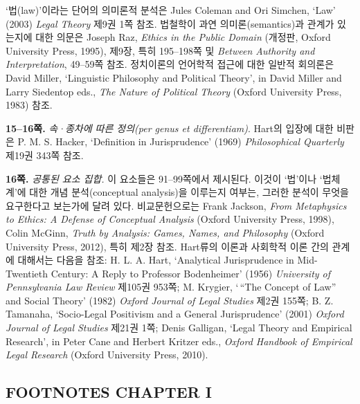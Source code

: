 \documentclass[12pt, oneside]{book}  %
\begin{document}
`법(law)'이라는 단어의 의미론적 분석은 Jules Coleman and Ori Simchen,
`Law' (2003) \emph{Legal Theory} 제9권 1쪽 참조. 법철학이 과연
의미론(semantics)과 관계가 있는지에 대한 의문은 Joseph Raz, \emph{Ethics
in the Public Domain} (개정판, Oxford University Press, 1995), 제9장,
특히 195--198쪽 및 \emph{Between Authority and Interpretation}, 49--59쪽
참조. 정치이론의 언어학적 접근에 대한 일반적 회의론은 David Miller,
`Linguistic Philosophy and Political Theory', in David Miller and Larry
Siedentop eds., \emph{The Nature of Political Theory} (Oxford University
Press, 1983) 참조.

\textbf{15--16쪽.} \emph{속·종차에 따른 정의(per genus et
differentiam)}. Hart의 입장에 대한 비판은 P. M. S. Hacker, `Definition
in Jurisprudence' (1969) \emph{Philosophical Quarterly} 제19권 343쪽
참조.

\textbf{16쪽.} \emph{공통된 요소 집합.} 이 요소들은 91--99쪽에서
제시된다. 이것이 `법'이나 `법체계'에 대한 개념 분석(conceptual
analysis)을 이루는지 여부는, 그러한 분석이 무엇을 요구한다고 보는가에
달려 있다. 비교문헌으로는 Frank Jackson, \emph{From Metaphysics to
Ethics: A Defense of Conceptual Analysis} (Oxford University Press,
1998), Colin McGinn, \emph{Truth by Analysis: Games, Names, and
Philosophy} (Oxford University Press, 2012), 특히 제2장 참조. Hart류의
이론과 사회학적 이론 간의 관계에 대해서는 다음을 참조: H. L. A. Hart,
`Analytical Jurisprudence in Mid-Twentieth Century: A Reply to Professor
Bodenheimer' (1956) \emph{University of Pennsylvania Law Review} 제105권
953쪽; M. Krygier, `\,``The Concept of Law'' and Social Theory' (1982)
\emph{Oxford Journal of Legal Studies} 제2권 155쪽; B. Z. Tamanaha,
`Socio-Legal Positivism and a General Jurisprudence' (2001) \emph{Oxford
Journal of Legal Studies} 제21권 1쪽; Denis Galligan, `Legal Theory and
Empirical Research', in Peter Cane and Herbert Kritzer eds.,
\emph{Oxford Handbook of Empirical Legal Research} (Oxford University
Press, 2010).

\subsection{FOOTNOTES CHAPTER
I}\label{footnotes-chapter-i}  %
\end{document}
